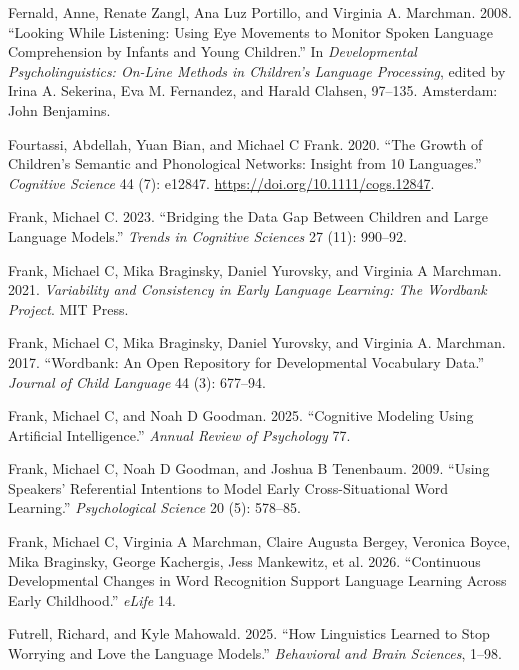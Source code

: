 \documentclass[
  11pt,
]{article}
\newlength{\cslhangindent}
\newenvironment{CSLReferences}[2] %
 {\begin{list}{}{%
  \setlength{\itemindent}{0pt}
  \setlength{\leftmargin}{0pt}
  \setlength{\parsep}{0pt}
  \ifodd #1
   \setlength{\leftmargin}{\cslhangindent}
   \setlength{\itemindent}{-1\cslhangindent}
  \fi
  \setlength{\itemsep}{#2\baselineskip}}}
 {\end{list}}
\begin{document}
\begin{CSLReferences}{1}{0}
Fernald, Anne, Renate Zangl, Ana Luz Portillo, and Virginia A. Marchman.
2008. {``Looking While Listening: Using Eye Movements to Monitor Spoken
Language Comprehension by Infants and Young Children.''} In
\emph{Developmental Psycholinguistics: On-Line Methods in Children's
Language Processing}, edited by Irina A. Sekerina, Eva M. Fernandez, and
Harald Clahsen, 97--135. Amsterdam: John Benjamins.

Fourtassi, Abdellah, Yuan Bian, and Michael C Frank. 2020. {``The Growth
of Children's Semantic and Phonological Networks: Insight from 10
Languages.''} \emph{Cognitive Science} 44 (7): e12847.
\url{https://doi.org/10.1111/cogs.12847}.

Frank, Michael C. 2023. {``Bridging the Data Gap Between Children and
Large Language Models.''} \emph{Trends in Cognitive Sciences} 27 (11):
990--92.

Frank, Michael C, Mika Braginsky, Daniel Yurovsky, and Virginia A
Marchman. 2021. \emph{Variability and Consistency in Early Language
Learning: The Wordbank Project}. MIT Press.

Frank, Michael C, Mika Braginsky, Daniel Yurovsky, and Virginia A.
Marchman. 2017. {``Wordbank: An Open Repository for Developmental
Vocabulary Data.''} \emph{Journal of Child Language} 44 (3): 677--94.

Frank, Michael C, and Noah D Goodman. 2025. {``Cognitive Modeling Using
Artificial Intelligence.''} \emph{Annual Review of Psychology} 77.

Frank, Michael C, Noah D Goodman, and Joshua B Tenenbaum. 2009. {``Using
Speakers' Referential Intentions to Model Early Cross-Situational Word
Learning.''} \emph{Psychological Science} 20 (5): 578--85.

Frank, Michael C, Virginia A Marchman, Claire Augusta Bergey, Veronica
Boyce, Mika Braginsky, George Kachergis, Jess Mankewitz, et al. 2026.
{``Continuous Developmental Changes in Word Recognition Support Language
Learning Across Early Childhood.''} \emph{eLife} 14.

Futrell, Richard, and Kyle Mahowald. 2025. {``How Linguistics Learned to
Stop Worrying and Love the Language Models.''} \emph{Behavioral and
Brain Sciences}, 1--98.


\end{CSLReferences}
\end{document}
